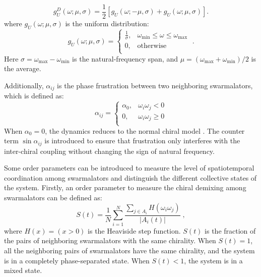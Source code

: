 \documentclass{article}
\begin{document}
\begin{equation}
    g_U^{D}\left( \omega ;\mu,\sigma\right) 
    =\frac{1}{2}\left [
    g_U\left( \omega ;-\mu,\sigma\right) + 
    g_U\left( \omega ; \mu,\sigma\right) \right ].
    \label{eq:uniform2}
\end{equation}
where $g_U\left( \omega ;\mu ,\sigma \right)$ is the uniform distribution:
\begin{equation}
    g_U\left( \omega ;\mu ,\sigma \right) =\begin{cases}
	\frac{1}{\sigma},&		\omega _{\min}\leqslant \omega \leqslant \omega _{\max}\\
	0,&		\mathrm{otherwise}\\
\end{cases}\;.
\label{eq:uniform}
\end{equation}
Here $\sigma = \omega_{\max}-\omega _{\min}$ is the natural-frequency span, and $\mu = (\omega_{\max}+\omega _{\min})/2$ is the average.

Additionally, $\alpha_{ij}$ is the phase frustration between two neighboring swarmalators, which is defined as:
\begin{equation}
    \alpha _{ij}=\begin{cases}
        \alpha _0,&		\omega _i\omega _j<0\\
        0,&		\omega _i\omega _j\geqslant 0\\
    \end{cases}
\end{equation}
When $\alpha_0=0$, the dynamics reduces to the normal chiral model \cite{LU2025115794}. 
The counter term $\sin\alpha_{ij}$ is introduced to ensure that frustration only interferes with the inter-chiral coupling without changing the sign of natural frequency. 

Some order parameters can be introduced to measure the level of spatiotemporal coordination among swarmalators and distinguish the different collective states of the system. 
Firstly, an order parameter to measure the chiral demixing among swarmalators can be defined as:
\begin{equation}
    S\left( t \right) =\frac{1}{N}\sum_{i=1}^N{\frac{\sum_{j\in A_i}{H\left( \omega _i\omega _j \right)}}{\left| A_i\left( t \right) \right|}}\;,
\end{equation}
where $H\left( x \right) =\left( x>0 \right)$ is the Heaviside step function. $S\left( t \right)$ is the fraction of the pairs of neighboring swarmalators with the same chirality. When $S\left( t \right)=1$, all the neighboring pairs of swarmalators have the same chirality, and the system is in a completely phase-separated state. When $S\left( t \right)< 1$, the system is in a mixed state.
\end{document}
